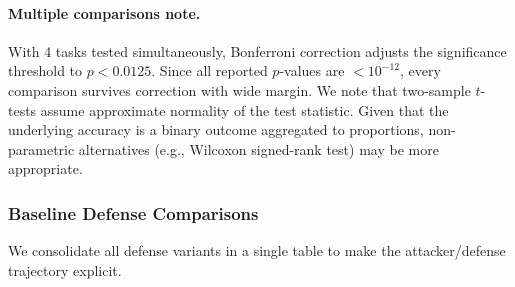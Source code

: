 \documentclass[10pt,twocolumn]{article}
\begin{document}
\paragraph{Multiple comparisons note.}
With 4 tasks tested simultaneously, Bonferroni correction adjusts the significance threshold to $p < 0.0125$. Since all reported $p$-values are $< 10^{-12}$, every comparison survives correction with wide margin.
We note that two-sample $t$-tests assume approximate normality of the test statistic. Given that the underlying accuracy is a binary outcome aggregated to proportions, non-parametric alternatives (e.g., Wilcoxon signed-rank test) may be more appropriate.

\subsubsection{Baseline Defense Comparisons}

We consolidate all defense variants in a single table to make the attacker/defense trajectory explicit.
\end{document}
